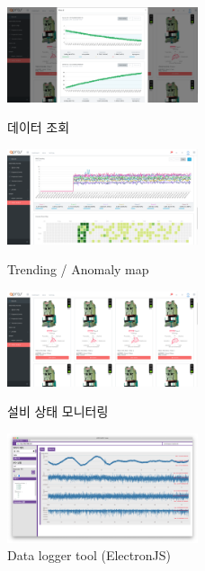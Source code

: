 \documentclass[10pt,a4paper,ragged2e]{altacv}
\begin{document}
\begin{fullwidth}
\begin{figure}[!ht]
\begin{fullwidth}
{			}\qquad
			\parbox{0.5\textwidth}{
				\centering
				\includegraphics[width=0.5\textwidth]{images/new_dashboard_05.png}
				\caption*{데이터 조회}
			}
			\parbox{0.5\textwidth}{
				\centering
				\includegraphics[width=0.5\textwidth]{images/new_dashboard_06.png}
				\caption*{Trending / Anomaly map}
			}\qquad
			\parbox{0.5\textwidth}{
				\centering
				\includegraphics[width=0.5\textwidth]{images/new_dashboard_04.png}
				\caption*{설비 상태 모니터링}
			}\qquad
			\parbox{0.5\textwidth}{
				\centering
				\includegraphics[width=0.5\textwidth]{images/mcdl-01.png}
				\caption*{Data logger tool (ElectronJS)}
			}
		\end{fullwidth}
	\end{figure}

\end{fullwidth}
\end{document}
